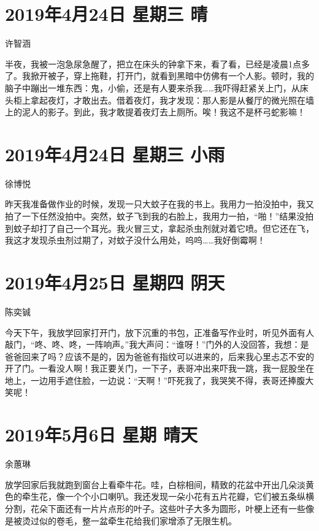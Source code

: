 \section{2019年4月24日 星期三 晴}

许智涵

半夜，我被一泡急尿急醒了，把立在床头的钟拿下来，看了看，已经是凌晨1点多了。我掀开被子，穿上拖鞋，打开门，就看到黑暗中仿佛有一个人影。顿时，我的脑子中蹦出一堆东西：鬼，小偷，还是有人要来杀我\ldots\ldots 我吓得赶紧关上门，从床头柜上拿起夜灯，才敢出去。借着夜灯，我才发现：那人影是从餐厅的微光照在墙上的泥人的影子。到此，我才敢提着夜灯去上厕所。唉！我这不是杯弓蛇影嘛！

\section{2019年4月24日 星期三 小雨}

徐博悦

昨天我准备做作业的时候，发现一只大蚊子在我的书上。我用力一拍没拍中，我又拍了一下任然没拍中。突然，蚊子飞到我的右脸上，我用力一拍，``啪！''结果没拍到蚊子却打了自己一个耳光。我火冒三丈，拿起杀虫剂就对着它喷。但它还在飞，我这才发现杀虫剂过期了，对蚊子没什么用处，呜呜\ldots\ldots 我好倒霉啊！

\section{2019年4月25日 星期四 阴天}

陈奕铖

今天下午，我放学回家打开门，放下沉重的书包，正准备写作业时，听见外面有人敲门，``咚、咚、咚，一阵响声。''我大声问：``谁呀！''门外的人没回答，我想：是爸爸回来了吗？应该不是的，因为爸爸有指纹可以进来的，后来我心里忐忑不安的开了门。一看没人啊！我正要关门，一下子，表哥冲出来吓我一跳，我一屁股坐在地上，一边用手遮住脸，一边说：``天啊！''吓死我了，我哭笑不得，表哥还捧腹大笑呢！

\section{2019年5月6日 星期 晴天}

余蕙琳

放学回家后我就跑到窗台上看牵牛花。哇，白棕相间，精致的花盆中开出几朵淡黄色的牵生花，像一个个小口喇叭。我还发现一朵小花有五片花瓣，它们被五条纵横分割，花朵下面还有一片片点形的叶子。这些叶子大多为圆形，叶梗上还有一些像是被烫过似的卷毛，整一盆牵生花给我们家增添了无限生机。

